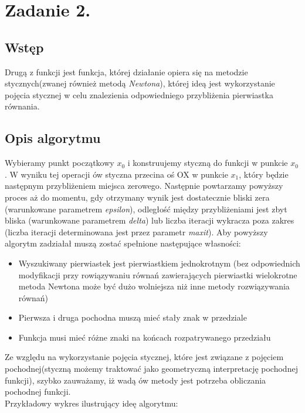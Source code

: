 \documentclass[a4paper,14pt]{report}
\begin{document}
\chapter{Zadanie 2.}
  \section{Wstęp}
  Drugą z funkcji jest funkcja, której działanie opiera się na metodzie stycznych(zwanej również metodą \textit{Newtona}), której ideą jest wykorzystanie pojęcia stycznej w celu znalezienia odpowiedniego przybliżenia pierwiastka równania.
  \section{Opis algorytmu}
  Wybieramy punkt początkowy $x_{0}$ i konstruujemy styczną do funkcji w punkcie $x_{0}$. W wyniku tej operacji ów styczna przecina oś OX w punkcie $x_{1}$, który będzie następnym przybliżeniem miejsca zerowego. Następnie powtarzamy powyższy proces aż do momentu, gdy otrzymany wynik jest dostatecznie bliski zera (warunkowane parametrem \textit{epsilon}), odległość między przybliżeniami jest zbyt bliska (warunkowane parametrem \textit{delta}) lub liczba iteracji wykracza poza zakres (liczba iteracji determinowana jest przez parametr \textit{maxit}).
  Aby powyższy algorytm zadziałał muszą zostać spełnione następujące własności:
  \begin{itemize}
    \item Wyszukiwany pierwiastek jest pierwiastkiem jednokrotnym (bez odpowiednich modyfikacji przy rowiązywaniu równań zawierających pierwiastki wielokrotne metoda Newtona może być dużo wolniejsza niż inne metody rozwiązywania równań)
    \item Pierwsza i druga pochodna muszą mieć stały znak w przedziale
    \item Funkcja musi mieć różne znaki na końcach rozpatrywanego przedziału
  \end{itemize}
  Ze względu na wykorzystanie pojęcia stycznej, które jest związane z pojęciem pochodnej(styczną możemy traktować jako geometryczną interpretację pochodnej funkcji), szybko zauważamy, iż wadą ów metody jest potrzeba obliczania pochodnej funkcji. \\
  Przykładowy wykres ilustrujący ideę algorytmu: 
\end{document}
